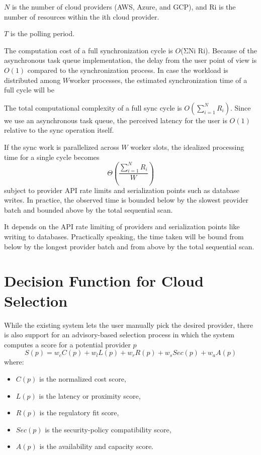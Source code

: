 $N$ is the number of cloud providers (AWS, Azure, and GCP), and Ri is the number of resources within the ith cloud provider. 

$T$ is the polling period.


The computation cost of a full synchronization cycle is $O$(ΣNi Ri). Because of the asynchronous task queue implementation, the delay from the user point of view is $O(1)$ compared to the synchronization process.
In case the workload is distributed among $W$worker processes, the estimated synchronization time of a full cycle will be


The total computational complexity of a full sync cycle is $O(\sum_{i=1}^{N} R_i)$. Since we use an asynchronous task queue, the perceived latency for the user is $O(1)$ relative to the sync operation itself.

If the sync work is parallelized across $W$ worker slots, the idealized processing time for a single cycle becomes
\[
\Theta \left( \frac{\sum_{i=1}^{N} R_i}{W} \right)
\]
subject to provider API rate limits and serialization points such as database writes. In practice, the observed time is bounded below by the slowest provider batch and bounded above by the total sequential scan.

It depends on the API rate limiting of providers and serialization points like writing to databases. Practically speaking, the time taken will be bound from below by the longest provider batch and from above by the total sequential scan.


\section{Decision Function for Cloud Selection}
While the existing system lets the user manually pick the desired provider, there is also support for an advisory-based selection process in which the system computes a score for a potential provider $p$
\[
S(p) = w_c C(p) + w_l L(p) + w_r R(p) + w_s Sec(p) + w_a A(p)
\]
where:
\begin{itemize}
    \item $C(p)$ is the normalized cost score,
    \item $L(p)$ is the latency or proximity score,
    \item $R(p)$ is the regulatory fit score,
    \item $Sec(p)$ is the security-policy compatibility score,
    \item $A(p)$ is the availability and capacity score.
\end{itemize}

